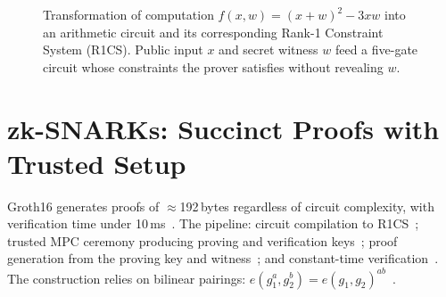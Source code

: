 \documentclass[sigconf,nonacm]{acmart}
\begin{document}
\begin{figure}[t]
\caption{Transformation of computation $f(x,w)=(x+w)^2-3xw$ into an arithmetic
  circuit and its corresponding Rank-1 Constraint System (R1CS).  Public input
  $x$ and secret witness $w$ feed a five-gate circuit whose constraints the
  prover satisfies without revealing $w$.}
\label{fig:circuit_encoding}
\end{figure}

\section{zk-SNARKs: Succinct Proofs with Trusted Setup}
\label{sec:snarks}

Groth16 generates proofs of $\approx$192\,bytes regardless of circuit complexity, with
verification time under 10\,ms~\cite{groth16_performance_2023}. The pipeline: circuit
compilation to R1CS~\cite{circuit_compilation_2023}; trusted MPC ceremony producing
proving and verification keys~\cite{trusted_setup_2024}; proof generation from the
proving key and witness~\cite{proof_generation_2023}; and constant-time
verification~\cite{constant_verification_2024}. The construction relies on bilinear
pairings: $e(g_1^a, g_2^b)=e(g_1,g_2)^{ab}$~\cite{pairing_crypto_2022}.
\end{document}
